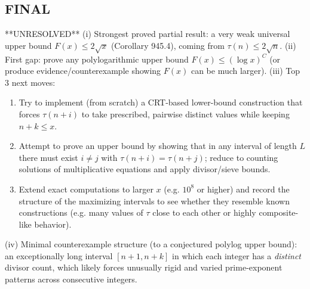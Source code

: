 \subsection*{FINAL}
**UNRESOLVED**
(i) Strongest proved partial result: a very weak universal upper bound $F(x)\le 2\sqrt{x}$ (Corollary 945.4), coming from $\tau(n)\le 2\sqrt{n}$.
(ii) First gap: prove any polylogarithmic upper bound $F(x)\le (\log x)^C$ (or produce evidence/counterexample showing $F(x)$ can be much larger).
(iii) Top 3 next moves:
\begin{enumerate}
\item Try to implement (from scratch) a CRT-based lower-bound construction that forces $\tau(n+i)$ to take prescribed, pairwise distinct values while keeping $n+k\le x$.
\item Attempt to prove an upper bound by showing that in any interval of length $L$ there must exist $i\ne j$ with $\tau(n+i)=\tau(n+j)$; reduce to counting solutions of multiplicative equations and apply divisor/sieve bounds.
\item Extend exact computations to larger $x$ (e.g. $10^8$ or higher) and record the structure of the maximizing intervals to see whether they resemble known constructions (e.g. many values of $\tau$ close to each other or highly composite-like behavior).
\end{enumerate}
(iv) Minimal counterexample structure (to a conjectured polylog upper bound): an exceptionally long interval $[n+1,n+k]$ in which each integer has a \emph{distinct} divisor count, which likely forces unusually rigid and varied prime-exponent patterns across consecutive integers.



